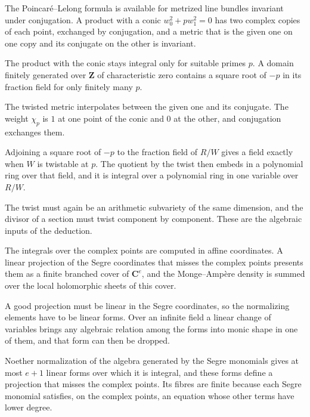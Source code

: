 The Poincar\'e--Lelong formula is available for metrized line bundles invariant under conjugation. A product with a
conic $w_0^2+pw_1^2=0$ has two complex copies of each point, exchanged by conjugation, and a metric that is the given
one on one copy and its conjugate on the other is invariant.

The product with the conic stays integral only for suitable primes $p$. A domain finitely generated over $\mathbf Z$
of characteristic zero contains a square root of $-p$ in its fraction field for only finitely many $p$.

The twisted metric interpolates between the given one and its conjugate. The weight $\chi_p$ is $1$ at one point of the
conic and $0$ at the other, and conjugation exchanges them.

Adjoining a square root of $-p$ to the fraction field of $R/W$ gives a field exactly when $W$ is twistable at $p$. The
quotient by the twist then embeds in a polynomial ring over that field, and it is integral over a polynomial ring in
one variable over $R/W$.

The twist must again be an arithmetic subvariety of the same dimension, and the divisor of a section must twist
component by component. These are the algebraic inputs of the deduction.

The integrals over the complex points are computed in affine coordinates. A linear projection of the Segre coordinates
that misses the complex points presents them as a finite branched cover of $\mathbf C^e$, and the Monge--Amp\`ere density
is summed over the local holomorphic sheets of this cover.

A good projection must be linear in the Segre coordinates, so the normalizing elements have to be linear forms. Over an
infinite field a linear change of variables brings any algebraic relation among the forms into monic shape in one of
them, and that form can then be dropped.

Noether normalization of the algebra generated by the Segre monomials gives at most $e+1$ linear forms over which it is
integral, and these forms define a projection that misses the complex points. Its fibres are finite because each Segre
monomial satisfies, on the complex points, an equation whose other terms have lower degree.

